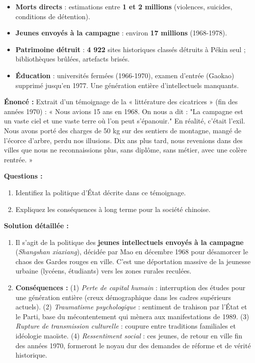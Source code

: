 \documentclass[11pt]{article}
\begin{document}
\begin{exemplebox}
\begin{itemize}
    \item \textbf{Morts directs} : estimations entre \textbf{1 et 2 millions} (violences, suicides, conditions de détention).
    \item \textbf{Jeunes envoyés à la campagne} : environ \textbf{17 millions} (1968-1978).
    \item \textbf{Patrimoine détruit} : \textbf{4 922} sites historiques classés détruits à Pékin seul ; bibliothèques brûlées, artefacts brisés.
    \item \textbf{Éducation} : universités fermées (1966-1970), examen d'entrée (Gaokao) supprimé jusqu'en 1977. Une génération entière d'intellectuels manquants.
\end{itemize}
\end{exemplebox}

\begin{exoresolu}
\textbf{Énoncé :} Extrait d'un témoignage de la « littérature des cicatrices » (fin des années 1970) : « Nous avions 15 ans en 1968. On nous a dit : "La campagne est un vaste ciel et une vaste terre où l'on peut s'épanouir." En réalité, c'était l'exil. Nous avons porté des charges de 50 kg sur des sentiers de montagne, mangé de l'écorce d'arbre, perdu nos illusions. Dix ans plus tard, nous revenions dans des villes que nous ne reconnaissions plus, sans diplôme, sans métier, avec une colère rentrée. »

\textbf{Questions :}
\begin{enumerate}
    \item Identifiez la politique d'État décrite dans ce témoignage.
    \item Expliquez les conséquences à long terme pour la société chinoise.
\end{enumerate}
\tcblower
\textbf{Solution détaillée :}
\begin{enumerate}
    \item Il s'agit de la politique des \textbf{jeunes intellectuels envoyés à la campagne} (\emph{Shangshan xiaxiang}), décidée par Mao en décembre 1968 pour désamorcer le chaos des Gardes rouges en ville. C'est une déportation massive de la jeunesse urbaine (lycéens, étudiants) vers les zones rurales reculées.
    \item \textbf{Conséquences :} (1) \emph{Perte de capital humain} : interruption des études pour une génération entière (creux démographique dans les cadres supérieurs actuels). (2) \emph{Traumatisme psychologique} : sentiment de trahison par l'État et le Parti, base du mécontentement qui mènera aux manifestations de 1989. (3) \emph{Rupture de transmission culturelle} : coupure entre traditions familiales et idéologie maoïste. (4) \emph{Ressentiment social} : ces jeunes, de retour en ville fin des années 1970, formeront le noyau dur des demandes de réforme et de vérité historique.
\end{enumerate}
\end{exoresolu}
\end{document}
